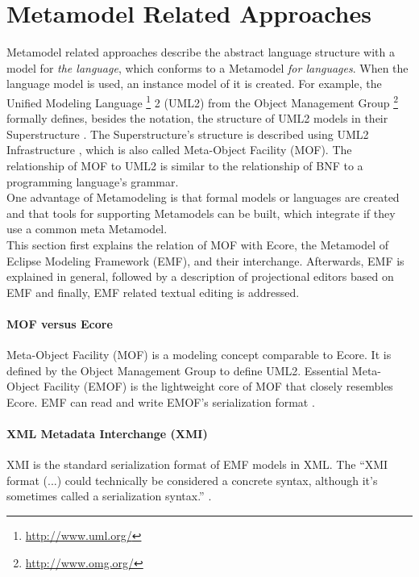 \section{Metamodel Related Approaches} \label{sec:metaApproaches}
Metamodel related approaches describe the abstract language structure with a model for \emph{the language}, which conforms to a Metamodel \emph{for languages}. When the language model is used, an instance model of it is created. For example, the Unified Modeling Language \footnote{\raggedright \url{http://www.uml.org/}}  2 (UML2) from the Object Management Group \footnote{\raggedright \url{http://www.omg.org/}} formally defines, besides the notation, the structure of UML2 models in their Superstructure \cite{Uml23s}. The Superstructure's structure is described using UML2 Infrastructure \cite{Uml23i}, which is also called Meta-Object Facility (MOF). The relationship of MOF to UML2 is similar to the relationship of BNF to a programming language's grammar.\\
One advantage of Metamodeling is that formal models or languages are created and that tools for supporting Metamodels can be built, which integrate if they use a common meta Metamodel.\\

This section first explains the relation of MOF with Ecore, the Metamodel of Eclipse Modeling Framework (EMF), and their interchange. Afterwards, EMF is explained in general, followed by a description of projectional editors based on EMF and finally, EMF related textual editing is addressed.

\paragraph{MOF versus Ecore}
Meta-Object Facility (MOF) is a modeling concept comparable to Ecore. It is defined by the Object Management Group \cite{OMG} to define UML2. Essential Meta-Object Facility (EMOF) is the lightweight core of MOF that closely resembles Ecore. EMF can read and write EMOF's serialization format \cite{EMP}.

\paragraph{XML Metadata Interchange (XMI)}
XMI is the standard serialization format of EMF models in XML. The ``XMI format (...) could technically be considered a concrete syntax, although it's sometimes called a serialization syntax.'' \cite{EMP}.


